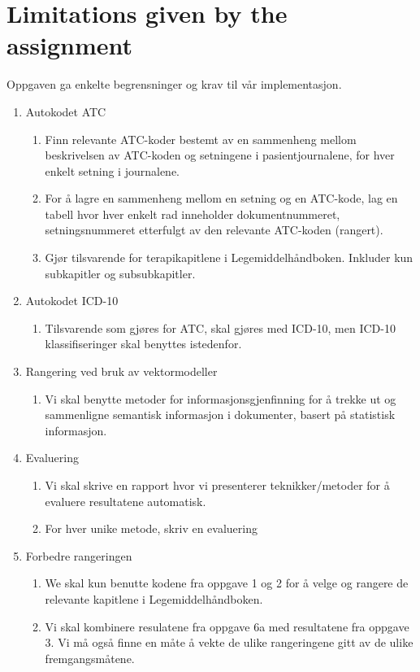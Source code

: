 \chapter{Limitations given by the assignment}

Oppgaven ga enkelte begrensninger og krav til vår implementasjon.
\begin{enumerate}
\item{Autokodet ATC}
\begin{enumerate}
\item{Finn relevante ATC-koder bestemt av en sammenheng mellom beskrivelsen av ATC-koden og setningene i pasientjournalene, for hver enkelt setning i journalene.}
\item{For å lagre en sammenheng mellom en setning og en ATC-kode, lag en tabell hvor hver enkelt rad inneholder dokumentnummeret, setningsnummeret etterfulgt av den relevante ATC-koden (rangert).}
\item{Gjør tilsvarende for terapikapitlene i Legemiddelhåndboken. Inkluder kun subkapitler og subsubkapitler.}
\end{enumerate}
\item{Autokodet ICD-10}
\begin{enumerate}
\item{Tilsvarende som gjøres for ATC, skal gjøres med ICD-10, men ICD-10 klassifiseringer skal benyttes istedenfor.}
\end{enumerate}
\item{Rangering ved bruk av vektormodeller}
\begin{enumerate}
\item{Vi skal benytte metoder for informasjonsgjenfinning for å trekke ut og sammenligne semantisk informasjon i dokumenter, basert på statistisk informasjon.}
\end{enumerate}
\item{Evaluering}
\begin{enumerate}
\item{Vi skal skrive en rapport hvor vi presenterer teknikker/metoder for å evaluere resultatene automatisk.}
\item{For hver unike metode, skriv en evaluering}
\end{enumerate}
\item{Forbedre rangeringen}
\begin{enumerate}
\item{We skal kun benutte kodene fra oppgave 1 og 2 for å velge og rangere de relevante kapitlene i Legemiddelhåndboken.}
\item{Vi skal kombinere resulatene fra oppgave 6a med resultatene fra oppgave 3. Vi må også finne en måte å vekte de ulike rangeringene gitt av de ulike fremgangsmåtene.}

\end{enumerate}
\end{enumerate}
